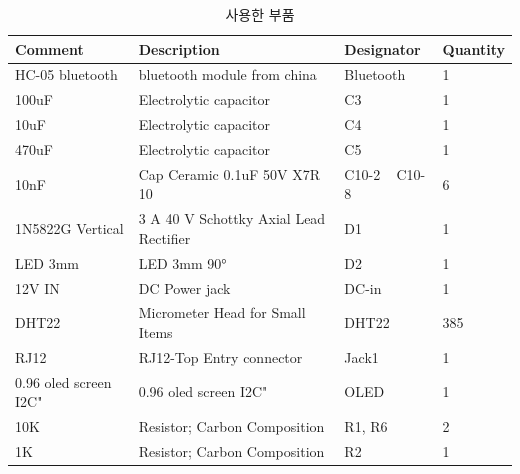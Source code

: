 \begin{table}[h]
		\caption{사용한 부품}
	\begin{tabular}{l|l|l|l}
		\toprule[1pt]
		Comment                  & Description                                   & Designator                               & Quantity \\
				\toprule[1pt]
		HC-05 bluetooth          & bluetooth module from china                   & Bluetooth                                & 1        \\
				\midrule[0.6pt]
		100uF                    & Electrolytic capacitor & C3                                       & 1        \\
						\midrule[0.6pt]
		10uF                     & Electrolytic capacitor & C4                                       & 1        \\
						\midrule[0.6pt]
		470uF                    & Electrolytic capacitor & C5                                       & 1        \\
						\midrule[0.6pt]
		10nF                     & Cap Ceramic 0.1uF 50V X7R 10 & C10-2 ~ C10-8 & 6        \\
						\midrule[0.6pt]
		1N5822G Vertical         & 3 A 40 V Schottky Axial Lead Rectifier        & D1                                       & 1        \\
								\midrule[0.6pt]
		LED 3mm                  & LED 3mm 90°                                   & D2                                       & 1        \\
								\midrule[0.6pt]
		12V IN                   & DC Power jack                                 & DC-in                                    & 1        \\
								\midrule[0.6pt]
		DHT22                    & Micrometer Head for Small Items& DHT22                                    & 385      \\
								\midrule[0.6pt]
		RJ12                     & RJ12-Top Entry connector                      & Jack1                                    & 1        \\
								\midrule[0.6pt]
		0.96 oled screen I2C"    & 0.96 oled screen I2C"                         & OLED                                     & 1        \\
								\midrule[0.6pt]
		10K                      & Resistor; Carbon Composition                  & R1, R6                                   & 2        \\
								\midrule[0.6pt]
		1K                       & Resistor; Carbon Composition                  & R2                                       & 1        \\

\end{tabular}
\end{table}
